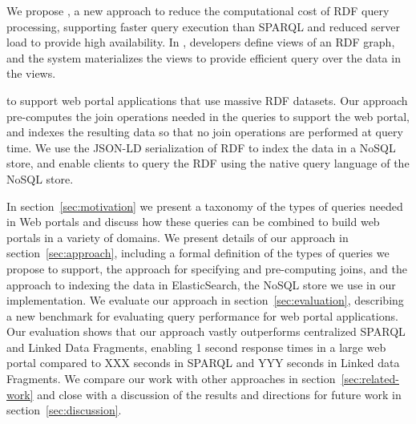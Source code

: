 We propose \ldviews, a new approach to reduce the computational cost of RDF query processing, supporting faster query execution than SPARQL and reduced server load to provide high availability.
In \ldviews, developers define views of an RDF graph, and the system materializes the views to provide efficient query over the data in the views.

to support web portal applications that use massive RDF datasets.
Our approach pre-computes the join operations needed in the queries to support the web portal, and indexes the resulting data so that no join operations are performed at query time.
We use the JSON-LD serialization of RDF \cite{Lanthaler:2012:UJC:2307819.2307827} to index the data in a NoSQL store, and enable clients to query the RDF using the native query language of the NoSQL store.

In section~\ref{sec:motivation} we present a taxonomy of the types of queries needed in Web portals and discuss how these queries can be combined to build web portals in a variety of domains.
We present details of our approach in section~\ref{sec:approach}, including a formal definition of the types of queries we propose to support, the approach for specifying and pre-computing joins, and the approach to indexing the data in ElasticSearch, the NoSQL store we use in our implementation.
We evaluate our approach in section~\ref{sec:evaluation}, describing a new benchmark for evaluating query performance for web portal applications. 
Our evaluation shows that our approach vastly outperforms centralized SPARQL and Linked Data Fragments, enabling 1 second response times in a large web portal compared to XXX seconds in SPARQL and YYY seconds in Linked data Fragments.
We compare our work with other approaches in section~\ref{sec:related-work} and close with a discussion of the results and directions for future work in section~\ref{sec:discussion}.
